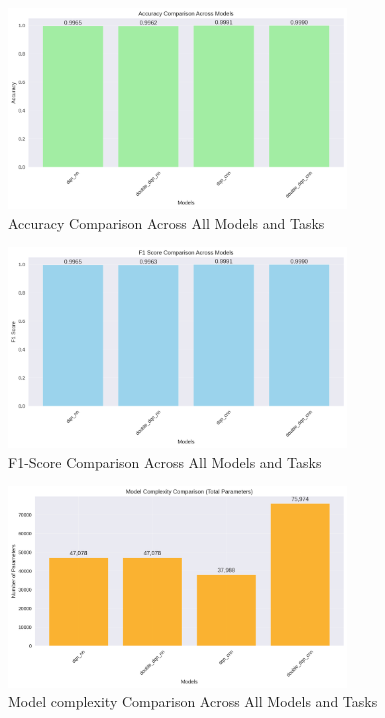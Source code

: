 \documentclass[12pt]{report}
\begin{document}
\begin{figure}[H]
    \centering
    \includegraphics[width=0.8\textwidth]{images/accuracy_comparison.png} %
    \caption{Accuracy Comparison Across All Models and Tasks}
    \label{fig:accuracy_comparison}
\end{figure}
\begin{figure}[H]
    \centering
    \includegraphics[width=0.8\textwidth]{images/f1_score_comparison.png} %
    \caption{F1-Score Comparison Across All Models and Tasks}
    \label{fig:f1_score_comparison}
\end{figure}
\begin{figure}[H]
    \centering
    \includegraphics[width=0.8\textwidth]{images/model_complexity_comparison.png} %
    \caption{Model complexity Comparison Across All Models and Tasks}
    \label{fig:model_complexity_comparison}
\end{figure}
\end{document}
